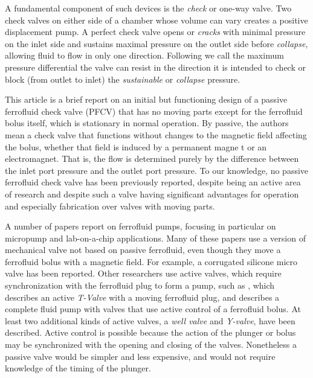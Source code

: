 \documentclass[]{asme2ej}
\begin{document}
A fundamental component of such
devices is the {\em check} or one-way valve.
Two check
valves on either side of a chamber whose volume can vary creates a
positive displacement pump.
A perfect check valve opens or
{\em cracks} with minimal pressure on the inlet side and sustains maximal
pressure on the outlet side before {\em collapse},
allowing fluid to flow in only one
direction. Following\cite{hartshorne2004ferrofluid} we call the maximum pressure
differential the valve can resist in the direction it is intended to
check or block (from outlet to inlet) the {\em sustainable} or {\em collapse} pressure.

This article is a brief report on an initial but functioning design of a
passive ferrofluid check valve (PFCV) that has no moving
parts except for the ferrofluid bolus itself, which is stationary
in normal operation.
By passive, the authors
mean a check valve that functions without changes to the magnetic
field affecting the bolus, whether that field is induced by a
permanent magne t or an electromagnet.
That is, the flow is determined
purely by the difference between the inlet port pressure and the
outlet port pressure.
To our knowledge, no passive
ferrofluid check valve has been previously reported, despite being an
active area of research and despite such a valve having
significant advantages for operation and especially
fabrication over valves with moving parts.


A number of papers report on ferrofluid pumps, focusing in particular
on micropump and lab-on-a-chip applications\cite{ozbey2015modeling,hsu2018biocompatible}.
Many of these papers use
a version of mechanical valve not based on passive
ferrofluid, even though they move a ferrofluid bolus
with a magnetic field.
For example,
a corrugated silicone micro valve\cite{yamahata2003ferrofluid,yamahata2005plastic}
has been reported.
Other researchers use active valves, which require synchronization with
the ferrofluid plug to form a pump,
such as \cite{menz2000fluidic}, which
describes an active {\em T-Valve} with a moving ferrofluid plug, and
\cite{ando2009ferrofluidic} describes a complete fluid pump with valves
that use
active control of a ferrofluid bolus.
At least two additional kinds of active valves, a {\em well valve} and
{\em Y-valve}, have
been described\cite{hartshorne2004ferrofluid}.
Active control is possible because the
action of the plunger or bolus may be synchronized with the opening and closing
of the valves.
Nonetheless a passive valve would be simpler and less
expensive, and would not require knowledge of the timing of the
plunger.
\end{document}
